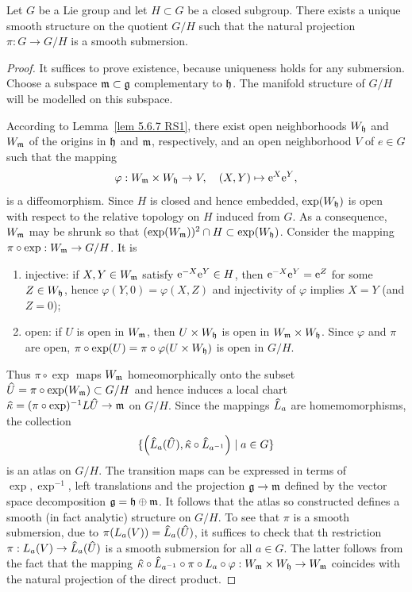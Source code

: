\begin{thm}
    Let $G$ be a Lie group and let $H\subset G$ be a closed subgroup. There exists a unique smooth structure on the quotient $G\slash H$ such that the natural projection $\pi:G\to G\slash H$ is a smooth submersion.
\end{thm}
\begin{proof}
    It suffices to prove existence, because uniqueness holds for any submersion. Choose a subspace $\mathfrak{m}\subset \mathfrak{g}$ complementary to $\mathfrak{h}$. The manifold structure of $G\slash H$ will be modelled on this subspace.

    According to Lemma~\ref{lem 5.6.7 RS1}, there exist open neighborhoods $W_{\mathfrak{h}}$ and $W_{\mathfrak{m}}$ of the origins in $\mathfrak{h}$ and $\mathfrak{m}$, respectively, and an open neighborhood $V$ of $e\in G$ such that the mapping
    \[\varphi:W_{\mathfrak{m}}\times W_{\mathfrak{h}}\to V,\quad (X,Y)\mapsto \mathrm{e}^X \mathrm{e}^Y,\]
    is a diffeomorphism. Since $H$ is closed and hence embedded, $\exp (W_{\mathfrak{h}})$ is open with respect to the relative topology on $H$ induced from $G$. As a consequence, $W_{\mathfrak{m}}$ may be shrunk so that $(\exp(W_{\mathfrak{m}}))^2\cap H\subset \exp(W_{\mathfrak{h}})$. Consider the mapping $\pi\circ \exp:W_{\mathfrak{m}}\to G\slash H$. It is
    \begin{enumerate}[label=(\alph*)]
        \item injective: if $X,Y\in W_{\mathfrak{m}}$ satisfy $\mathrm{e}^{-X}\mathrm{e}^Y\in H$, then $\mathrm{e}^{-X}\mathrm{e}^Y=\mathrm{e}^Z$ for some $Z\in W_{\mathfrak{h}}$, hence $\varphi(Y,0)=\varphi(X,Z)$ and injectivity of $\varphi$ implies $X=Y$ (and $Z=0$);
        \item open: if $U$ is open in $W_{\mathfrak{m}}$, then $U\times W_{\mathfrak{h}}$ is open in $W_{\mathfrak{m}}\times W_{\mathfrak{h}}$. Since $\varphi$ and $\pi$ are open, $\pi\circ\exp(U)=\pi\circ\varphi(U\times W_{\mathfrak{h}})$ is open in $G\slash H$.
    \end{enumerate}
    Thus $\pi\circ\exp$ maps $W_{\mathfrak{m}}$ homeomorphically onto the subset $\wh{U}=\pi\circ\exp(W_\frakm)\subset G\slash H$ and hence induces a local chart $\wh{\kappa}=(\pi\circ\exp)^{-1}L\wh{U}\to \frakm$ on $G\slash H$. Since the mappings $\wh{L}_a$ are homemomorphisms, the collection
    \[\{\left(\wh{L}_a(\wh{U}),\wh{\kappa}\circ \wh{L}_{a^{-1}}\right)\mid a\in G\}\]
    is an atlas on $G\slash H$. The transition maps can be expressed in terms of $\exp,\exp^{-1}$, left translations and the projection $\mathfrak{g}\to\mathfrak{m}$ defined by the vector space decomposition $\mathfrak{g}=\mathfrak{h}\oplus\mathfrak{m}$. It follows that the atlas so constructed defines a smooth (in fact analytic) structure on $G\slash H$. To see that $\pi$ is a smooth submersion, due to $\pi(L_a(V))=\wh{L}_a(\wh{U})$, it suffices to check that th restriction $\pi:L_a(V)\to \wh{L}_a(\wh{U})$ is a smooth submersion for all $a\in G$. The latter follows from the fact that the mapping $\wh{\kappa}\circ\wh{L}_{a^{-1}}\circ\pi\circ L_a\circ\varphi:W_\frakm\times W_\frakh\to W_\frakm$ coincides with the natural projection of the direct product.
\end{proof}



